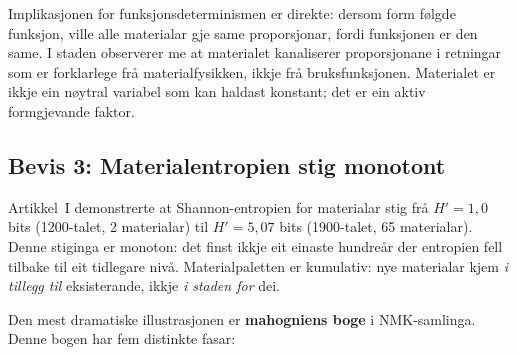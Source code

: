 \documentclass[10pt, a4paper, twocolumn]{article}
\begin{document}
Implikasjonen for funksjonsdeterminismen er direkte: dersom form følgde funksjon, ville alle materialar gje same proporsjonar, fordi funksjonen er den same. I staden observerer me at materialet kanaliserer proporsjonane i retningar som er forklarlege frå materialfysikken, ikkje frå bruksfunksjonen. Materialet er ikkje ein nøytral variabel som kan haldast konstant; det er ein aktiv formgjevande faktor.


\subsection{Bevis 3: Materialentropien stig monotont}

Artikkel~I demonstrerte at Shannon-entropien for materialar stig frå $H' = 1{,}0$ bits (1200-talet, 2 materialar) til $H' = 5{,}07$ bits (1900-talet, 65 materialar). Denne stiginga er monoton: det finst ikkje eit einaste hundreår der entropien fell tilbake til eit tidlegare nivå. Materialpaletten er kumulativ: nye materialar kjem \emph{i tillegg til} eksisterande, ikkje \emph{i staden for} dei.

Den mest dramatiske illustrasjonen er \textbf{mahogniens boge} i NMK-samlinga. Denne bogen har fem distinkte fasar:
\end{document}
